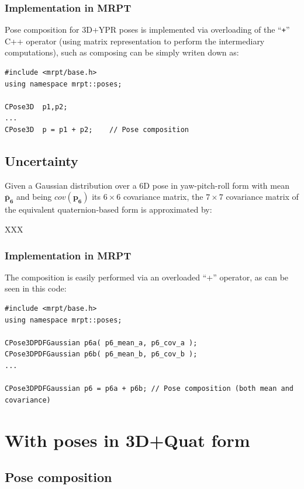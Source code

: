 \documentclass[a4paper,10pt]{report}
\begin{document}
\subsubsection{Implementation in MRPT}

Pose composition for 3D+YPR poses is implemented via overloading 
of the ``\texttt{+}'' C++ operator 
(using matrix representation to perform the intermediary computations), 
such as composing can be simply 
writen down as:

\begin{lstlisting}
#include <mrpt/base.h> 
using namespace mrpt::poses; 

CPose3D  p1,p2; 
...
CPose3D  p = p1 + p2;    // Pose composition
\end{lstlisting}

\subsection{Uncertainty}

Given a Gaussian distribution over a 6D pose in yaw-pitch-roll form with 
mean ${\mathbf{\bar{p}_6}}$ and being  $cov(\mathbf{p_6})$ its $6 \times 6$ covariance matrix, 
the $7 \times 7$ covariance matrix of the equivalent quaternion-based form 
is approximated by:

XXX

\subsubsection{Implementation in MRPT}

The composition is easily performed via an overloaded ``+'' operator, as can be seen in this code:

\begin{lstlisting}
#include <mrpt/base.h> 
using namespace mrpt::poses; 

CPose3DPDFGaussian p6a( p6_mean_a, p6_cov_a ); 
CPose3DPDFGaussian p6b( p6_mean_b, p6_cov_b ); 
...

CPose3DPDFGaussian p6 = p6a + p6b; // Pose composition (both mean and covariance)
\end{lstlisting}




\section{With poses in 3D+Quat form}

\subsection{Pose composition}
\end{document}
